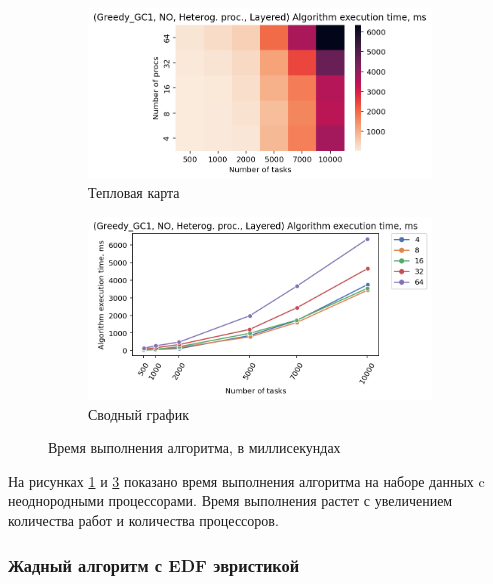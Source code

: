 \begin{figure}[!htbp]
    \centering
    \begin{subfigure}{0.49\textwidth}
        \includegraphics[width=\textwidth]{imgs/unbalanced/NO/et_heatmap.png}
        \caption{Тепловая карта}
        \label{fig:NO-unbalanced-exec-time-heatmap}
    \end{subfigure}
    \hfill
    \begin{subfigure}{0.49\textwidth}
        \includegraphics[width=\textwidth]{imgs/unbalanced/NO/tr_graph.png}
        \caption{Сводный график}
        \label{fig:NO-unbalanced-exec-time-compiled}
    \end{subfigure}
    \caption{Время выполнения алгоритма, в миллисекундах}
\end{figure}

На рисунках \ref{fig:NO-unbalanced-exec-time-heatmap} и \ref{fig:NO-unbalanced-exec-time-compiled} показано время выполнения алгоритма на наборе данных c неоднородными процессорами. Время выполнения растет с увеличением количества работ и количества процессоров.

\subsubsection{Жадный алгоритм с EDF эвристикой}

